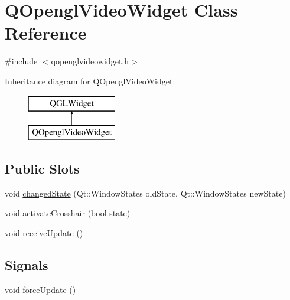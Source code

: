 \hypertarget{class_q_opengl_video_widget}{}\section{Q\+Opengl\+Video\+Widget Class Reference}
\label{class_q_opengl_video_widget}


{\ttfamily \#include $<$qopenglvideowidget.\+h$>$}

Inheritance diagram for Q\+Opengl\+Video\+Widget\+:\begin{figure}[H]
\begin{center}
\leavevmode
\includegraphics[height=2.000000cm]{class_q_opengl_video_widget}
\end{center}
\end{figure}
\subsection*{Public Slots}
\begin{DoxyCompactItemize}
\item 
void \mbox{\hyperlink{class_q_opengl_video_widget_a4f024f71a8de0fe02723afed8388ffb1}{changed\+State}} (Qt\+::\+Window\+States old\+State, Qt\+::\+Window\+States new\+State)
\item 
void \mbox{\hyperlink{class_q_opengl_video_widget_ab67a75026cc3213c618b7d25227f179c}{activate\+Crosshair}} (bool state)
\item 
void \mbox{\hyperlink{class_q_opengl_video_widget_ae73f50f66112684b2552b6e8496e0e6f}{receive\+Update}} ()
\end{DoxyCompactItemize}
\subsection*{Signals}
\begin{DoxyCompactItemize}
\item 
void \mbox{\hyperlink{class_q_opengl_video_widget_a597448d1dd651ceb1d7b1d0e3c21c273}{force\+Update}} ()
\end{DoxyCompactItemize}
